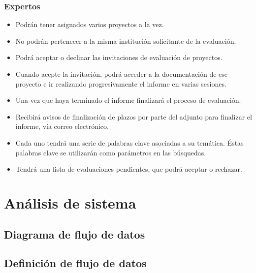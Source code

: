 \documentclass[12pt,a4paper,spanish,twoside]{article}
\begin{document}
\subsubsection{Expertos}
\begin{itemize}
\item Podrán tener asignados varios proyectos a la vez. 
\item No podrán pertenecer a la misma institución solicitante de la evaluación.
\item Podrá aceptar o declinar las invitaciones de evaluación de proyectos.
\item Cuando acepte la invitación, podrá acceder a la documentación de ese
  proyecto e ir realizando progresivamente el informe en varias sesiones. 
\item Una vez que haya terminado el informe finalizará el proceso de evaluación.
\item Recibirá avisos de finalización de plazos por parte del adjunto para
  finalizar el informe, vía correo electrónico.
\item Cada uno tendrá una serie de palabras clave asociadas a su
  temática. Éstas palabras clave se utilizarán como parámetros en las
  búsquedas. 
\item Tendrá una lista de evaluaciones pendientes, que podrá aceptar o rechazar.
\end{itemize}

\section{Análisis de sistema}
\subsection{Diagrama de flujo de datos}


\subsection{Definición de flujo de datos}
\end{document}
